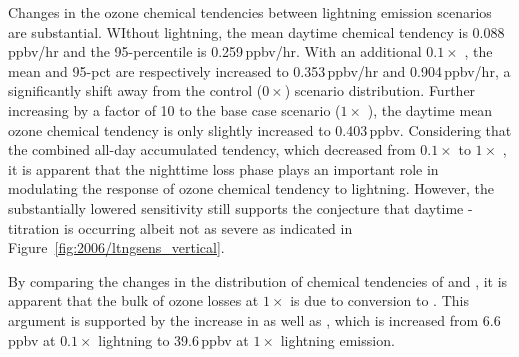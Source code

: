 Changes in the ozone chemical tendencies between lightning emission scenarios are substantial. WIthout lightning, the
mean daytime chemical tendency is 0.088\,\unit{ppbv/hr} and the 95-percentile is 0.259\,\unit{ppbv/hr}. With an additional
$0.1\times$ {\lnox}, the mean and 95-pct are respectively increased to 0.353\,\unit{ppbv/hr} and 0.904\,\unit{ppbv/hr},
a significantly shift away from the control ($0\times$) scenario distribution. Further increasing {\lnox} by a factor of 10 to
the base case scenario ($1\times$ {\lnox}), the daytime mean ozone chemical tendency is only slightly increased to
0.403\,\unit{ppbv}. Considering that the combined all-day accumulated tendency, which decreased from $0.1\times$ {\lnox}
to $1\times$ {\lnox}, it is apparent that the nighttime loss phase plays an important role in modulating the response of
ozone chemical tendency to lightning. However, the substantially lowered sensitivity still supports the conjecture that
daytime -titration is occurring albeit not as severe as indicated in Figure~\ref{fig:2006/ltngsens_vertical}.

By comparing the changes in the distribution of chemical tendencies of  and , it is apparent that
the bulk of ozone losses at $1\times$ is due to conversion to . This argument is supported by the increase
in  as well as , which is increased from 6.6\,\unit{ppbv} at $0.1\times$ lightning to 39.6\,\unit{ppbv}
at $1\times$ lightning emission.


